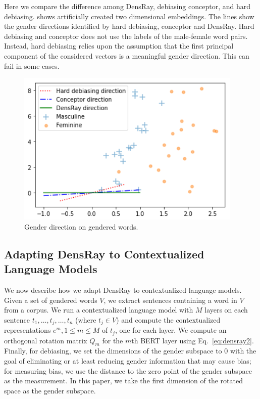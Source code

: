 Here we compare the difference among DensRay, debiasing conceptor, and hard debiasing.  shows artificially created two dimensional embeddings. The lines show the gender directions identified by hard debiasing, conceptor and DensRay. Hard debiasing and conceptor does not use the labels of the male-female word pairs. Instead, hard debiasing relies upon the assumption that the first principal component of the considered vectors is a meaningful gender direction. This can fail in some cases. 



\begin{figure}[h]
	\centering
	\includegraphics[width=0.9\linewidth]{examples.png}
	\caption{Gender direction on gendered words.}
\end{figure}

\subsection{Adapting DensRay to Contextualized Language Models}
We now describe how we adapt DensRay to contextualized
language models. Given a set of gendered words
$V$, we extract sentences containing a word in $V$ from a
corpus. We run a contextualized language model
with $M$ layers
on each
sentence
$t_1,\ldots,t_j,\ldots,t_n$ (where $t_j \in V$)
and compute the contextualized representations $e^m, 1\leq m
\leq M$ of $t_j$, one for each layer. 
We compute an orthogonal rotation
matrix $Q_m$ for the $m$th BERT layer using Eq.\
\ref{eq:densray2}.
Finally, for debiasing, we set the dimensions
of the gender subspace to $0$ with the goal of eliminating or at least reducing gender
information that may cause bias; for measuring bias, we use the distance to the zero point of the gender subspace as the measurement. In this paper, we take the first dimension of the rotated space as the gender subspace.

